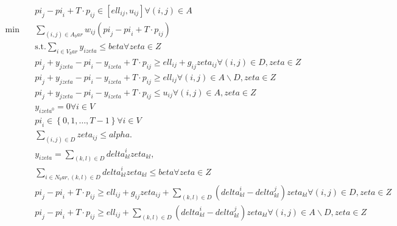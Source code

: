 \begin{align}
  & \mathit{pi}_{j} - \mathit{pi}_{i} + T \cdot p_{i j} \in \left[\mathit{ell}_{i j} , u_{i j}\right] \forall \left(i , j\right) \in A \tag{eq\_0001} \\
  \min\quad & \sum_{\left(i , j\right) \in A_bar} w_{i j} \left(\mathit{pi}_{j} - \mathit{pi}_{i} + T \cdot p_{i j}\right) \tag{eq\_0003} \\
  & \text{s}.\text{t}. \sum_{i \in V_bar} y_{i \mathit{zeta}} \leq \mathit{beta} \forall \mathit{zeta} \in Z \tag{eq\_0004} \\
  & \mathit{pi}_{j} + y_{j \mathit{zeta}} - \mathit{pi}_{i} - y_{i \mathit{zeta}} + T \cdot p_{i j} \geq \mathit{ell}_{i j} + g_{i j} \mathit{zeta}_{i j} \forall \left(i , j\right) \in D , \mathit{zeta} \in Z \tag{eq\_0005} \\
  & \mathit{pi}_{j} + y_{j \mathit{zeta}} - \mathit{pi}_{i} - y_{i \mathit{zeta}} + T \cdot p_{i j} \geq \mathit{ell}_{i j} \forall \left(i , j\right) \in A \backslash D , \mathit{zeta} \in Z \tag{eq\_0006} \\
  & \mathit{pi}_{j} + y_{j \mathit{zeta}} - \mathit{pi}_{i} - y_{i \mathit{zeta}} + T \cdot p_{i j} \leq u_{i j} \forall \left(i , j\right) \in A , \mathit{zeta} \in Z \tag{eq\_0007} \\
  & y_{i \mathit{zeta}^{0}} = 0 \forall i \in V \tag{eq\_0008} \\
  & \mathit{pi}_{i} \in \left\{0 , 1 , \ldots , T - 1\right\} \forall i \in V \tag{eq\_0010} \\
  & \sum_{\left(i , j\right) \in D} \mathit{zeta}_{i j} \leq \mathit{alpha} . \tag{eq\_0022} \\
  & y_{i \mathit{zeta}} = \sum_{\left(k , l\right) \in D} \mathit{delta}_{k l}^{i} \mathit{zeta}_{k l} , \tag{eq\_0023} \\
  & \sum_{i \in N_bar, \left(k , l\right) \in D} \mathit{delta}_{k l}^{i} \mathit{zeta}_{k l} \leq \mathit{beta} \forall \mathit{zeta} \in Z \tag{eq\_0024} \\
  & \mathit{pi}_{j} - \mathit{pi}_{i} + T \cdot p_{i j} \geq \mathit{ell}_{i j} + g_{i j} \mathit{zeta}_{i j} + \sum_{\left(k , l\right) \in D} \left(\mathit{delta}_{k l}^{i} - \mathit{delta}_{k l}^{j}\right) \mathit{zeta}_{k l} \forall \left(i , j\right) \in D , \mathit{zeta} \in Z \tag{eq\_0025} \\
  & \mathit{pi}_{j} - \mathit{pi}_{i} + T \cdot p_{i j} \geq \mathit{ell}_{i j} + \sum_{\left(k , l\right) \in D} \left(\mathit{delta}_{k l}^{i} - \mathit{delta}_{k l}^{j}\right) \mathit{zeta}_{k l} \forall \left(i , j\right) \in A \backslash D , \mathit{zeta} \in Z \tag{eq\_0026} \\

\end{align}
